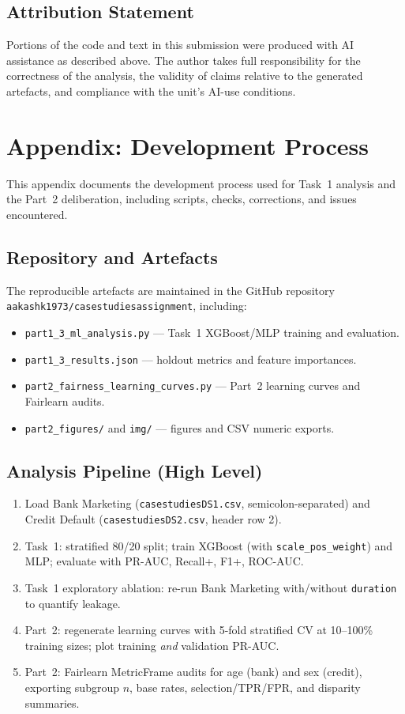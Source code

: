 \documentclass[11pt,a4paper]{article}
\begin{document}
\subsection{Attribution Statement}
Portions of the code and text in this submission were produced with AI assistance as
described above. The author takes full responsibility for the correctness of the
analysis, the validity of claims relative to the generated artefacts, and compliance
with the unit's AI-use conditions.


\newpage
\section{Appendix: Development Process}
\label{sec:appendix-process}

This appendix documents the development process used for Task~1 analysis and the
Part~2 deliberation, including scripts, checks, corrections, and issues encountered.

\subsection{Repository and Artefacts}
The reproducible artefacts are maintained in the GitHub repository
\texttt{aakashk1973/casestudiesassignment}, including:
\begin{itemize}
    \item \texttt{part1\_3\_ml\_analysis.py} --- Task~1 XGBoost/MLP training and evaluation.
    \item \texttt{part1\_3\_results.json} --- holdout metrics and feature importances.
    \item \texttt{part2\_fairness\_learning\_curves.py} --- Part~2 learning curves and
    Fairlearn audits.
    \item \texttt{part2\_figures/} and \texttt{img/} --- figures and CSV numeric exports.
\end{itemize}

\subsection{Analysis Pipeline (High Level)}
\begin{enumerate}
    \item Load Bank Marketing (\texttt{casestudiesDS1.csv}, semicolon-separated) and
    Credit Default (\texttt{casestudiesDS2.csv}, header row 2).
    \item Task~1: stratified 80/20 split; train XGBoost (with
    \texttt{scale\_pos\_weight}) and MLP; evaluate with PR-AUC, Recall+, F1+, ROC-AUC.
    \item Task~1 exploratory ablation: re-run Bank Marketing with/without
    \texttt{duration} to quantify leakage.
    \item Part~2: regenerate learning curves with 5-fold stratified CV at 10--100\%
    training sizes; plot training \emph{and} validation PR-AUC.
    \item Part~2: Fairlearn MetricFrame audits for age (bank) and sex (credit), exporting
    subgroup $n$, base rates, selection/TPR/FPR, and disparity summaries.
\end{enumerate}
\end{document}
